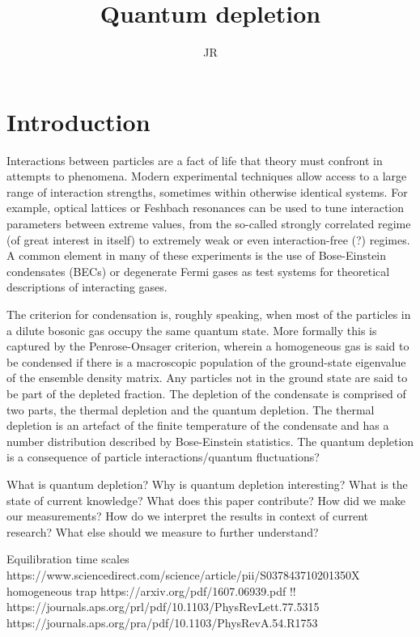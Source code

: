 \documentclass{article}
\title{Quantum depletion}
\author{JR}
\begin{document}
\maketitle

\section{Introduction}
Interactions between particles are a fact of life that theory must confront in attempts to phenomena. Modern experimental techniques allow access to a large range of interaction strengths, sometimes within otherwise identical systems. For example, optical lattices or Feshbach resonances can be used to tune interaction parameters between extreme values, from the so-called strongly correlated regime (of great interest in itself) to extremely weak or even interaction-free (?) regimes. A common element in many of these experiments is the use of Bose-Einstein condensates (BECs) or degenerate Fermi gases as test systems for theoretical descriptions of interacting gases. 

The criterion for condensation is, roughly speaking, when most of the particles in a dilute bosonic gas occupy the same quantum state. More formally this is captured by the Penrose-Onsager criterion, wherein a homogeneous gas is said to be condensed if there is a macroscopic population of the ground-state eigenvalue of the ensemble density matrix. Any particles not in the ground state are said to be part of the depleted fraction. The depletion of the condensate is comprised of two parts, the thermal depletion and the quantum depletion. The thermal depletion is an artefact of the finite temperature of the condensate and has a number distribution described by Bose-Einstein statistics. The quantum depletion is a consequence of particle interactions/quantum fluctuations?



What is quantum depletion?
Why is quantum depletion interesting?
What is the state of current knowledge?
What does this paper contribute?
How did we make our measurements?
How do we interpret the results in context of current research?
What else should we measure to further understand?

Equilibration time scales 
https://www.sciencedirect.com/science/article/pii/S037843710201350X homogeneous trap
https://arxiv.org/pdf/1607.06939.pdf !! 
https://journals.aps.org/prl/pdf/10.1103/PhysRevLett.77.5315
https://journals.aps.org/pra/pdf/10.1103/PhysRevA.54.R1753
\end{document}
